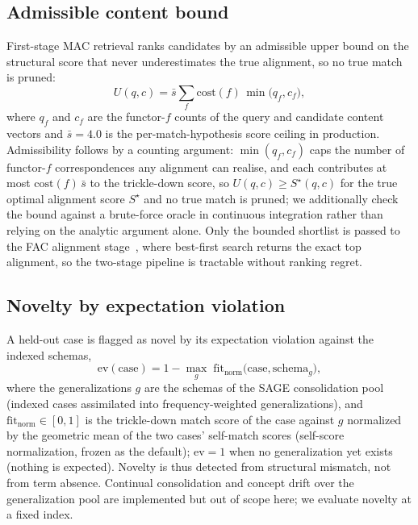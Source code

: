 \documentclass[pdflatex,sn-nature]{sn-jnl}
\begin{document}
\subsection{Admissible content bound}
 First-stage MAC retrieval ranks candidates by
an admissible upper bound on the structural score that never underestimates the
true alignment, so no true match is pruned:
\begin{equation}
U(q,c)=\bar s\sum_{f}\mathrm{cost}(f)\,\min\!\bigl(q_f,c_f\bigr),
\end{equation}
where $q_f$ and $c_f$ are the functor-$f$ counts of the query and candidate
content vectors and $\bar s{=}4.0$ is the per-match-hypothesis score ceiling in
production. Admissibility follows by a counting argument: $\min(q_f,c_f)$ caps the
number of functor-$f$ correspondences any alignment can realise, and each
contributes at most $\mathrm{cost}(f)\,\bar s$ to the trickle-down score, so
$U(q,c)\ge S^\star(q,c)$ for the true optimal alignment score $S^\star$ and no true
match is pruned; we additionally check the bound against a brute-force oracle in
continuous integration rather than relying on the analytic argument alone. Only the
bounded shortlist is passed to the FAC alignment stage~\cite{forbus1995macfac},
where best-first search returns the exact top alignment, so the two-stage pipeline
is tractable without ranking regret.

\subsection{Novelty by expectation violation}
 A held-out case is flagged as novel by
its expectation violation against the indexed schemas,
\begin{equation}
\mathrm{ev}(\mathrm{case})=1-\max_{g}\;\mathrm{fit}_{\mathrm{norm}}\!\bigl(\mathrm{case},\mathrm{schema}_g\bigr),
\end{equation}
where the generalizations $g$ are the schemas of the SAGE consolidation pool
(indexed cases assimilated into frequency-weighted generalizations), and
$\mathrm{fit}_{\mathrm{norm}}\in[0,1]$ is the trickle-down match score of the case
against $g$ normalized by the geometric mean of the two cases' self-match scores
(self-score normalization, frozen as the default); $\mathrm{ev}=1$ when no
generalization yet exists (nothing is expected). Novelty is thus detected from
structural mismatch, not from term absence. Continual consolidation and concept
drift over the generalization pool are implemented but out of scope here; we
evaluate novelty at a fixed index.
\end{document}
